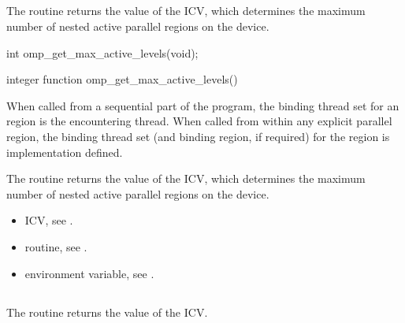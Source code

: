 \subsection{}
\label{subsec:omp_get_max_active_levels}
\summary
The  routine returns the value of the 
 ICV, which determines the maximum number of nested active parallel regions 
on the device. 

\format
\ccppspecificstart
\begin{boxedcode}
int omp\_get\_max\_active\_levels(void);
\end{boxedcode}
\ccppspecificend

\fortranspecificstart
\begin{boxedcode}
integer function omp\_get\_max\_active\_levels()
\end{boxedcode}
\fortranspecificend

\binding
When called from a sequential part of the program, the binding thread set for an 
 region is the encountering thread. When called 
from within any explicit parallel region, the binding thread set (and binding region, if 
required) for the  region is implementation defined. 

\effect
The  routine returns the value of the  ICV,
which determines the maximum number of nested active parallel regions 
on the device. 

\crossreferences
\begin{itemize}
\item {} ICV, see 
.

\item {} routine, see 
.

\item {} environment variable, see 
.
\end{itemize}








\subsection{}
\label{subsec:omp_get_level}
\summary
The  routine returns the value of the  ICV. 

